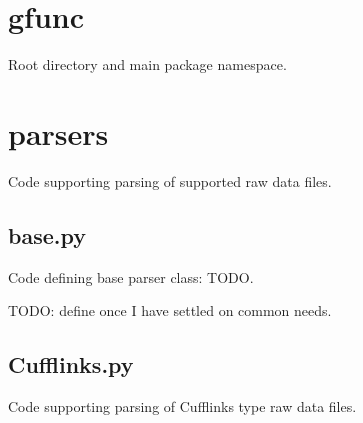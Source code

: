 \documentclass[letterpaper,10pt,english]{sphinxmanual}
\begin{document}
\section{gfunc}
\label{code:gfunc}
Root directory and main package namespace.
\label{code:module-gfunc.parsers.__init__}

\section{parsers}
\label{code:parsers}
Code supporting parsing of supported raw data files.
\label{code:module-gfunc.parsers.base}

\subsection{base.py}
\label{code:base-py}
Code defining base parser class: TODO.

\begin{fulllineitems}
\label{code:gfunc.parsers.base.GFuncParserBase}
TODO: define once I have settled on common needs.

\end{fulllineitems}

\label{code:module-gfunc.parsers.Cufflinks}

\subsection{Cufflinks.py}
\label{code:cufflinks-py}
Code supporting parsing of Cufflinks type raw data files.
\end{document}
